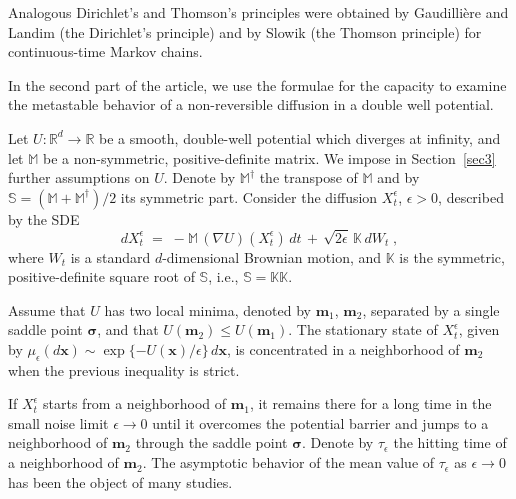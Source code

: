 \documentclass[reqno]{amsart}
\newcounter{as}[section]
\newcommand{\bb}[1]{{\mathbb #1}}
\newcommand{\bs}[1]{{\boldsymbol #1}}
\newcommand{\<}{\langle}
\renewcommand{\>}{\rangle}
\begin{document}
Analogous Dirichlet's and Thomson's principles were obtained by
Gaudilli\`ere and Landim \cite{GL} (the Dirichlet's principle) and by
Slowik \cite{Slo} (the Thomson principle) for continuous-time Markov
chains. \smallskip

In the second part of the article, we use the formulae for the
capacity to examine the metastable behavior of a non-reversible
diffusion in a double well potential.

Let $U\colon \bb R^d\to \bb R$ be a smooth, double-well potential which
diverges at infinity, and let $\bb M$ be a non-symmetric,
positive-definite matrix. We impose in Section~\ref{sec3} further assumptions on $U$. Denote by $\bb{M}^{\dagger}$ the transpose of $\bb
M$ and by $\bb S = (\bb{M}+\bb{M}^{\dagger})/2$ its symmetric part.
Consider the diffusion $X^\epsilon_t$, $\epsilon>0$, described by the
SDE
\begin{equation}
\label{1-3}
dX_{t}^{\epsilon}\;=\;-\bb{M} \, (\nabla U) (X_{t}^{\epsilon})\, dt
\,+\,\sqrt{2\epsilon}\, \bb{K}\, dW_{t}\;,
\end{equation}
where $W_{t}$ is a standard $d$-dimensional Brownian motion, and
$\bb{K}$ is the symmetric, positive-definite square root of $\bb{S}$, i.e.,
$\bb{S}=\bb K \bb K$.

Assume that $U$ has two local minima, denoted by $\bs m_1$, $\bs m_2$,
separated by a single saddle point $\bs \sigma$, and that $U(\bs m_2)
\le U(\bs m_1)$. The stationary state of $X^\epsilon_t$, given by
$\mu_\epsilon(d\bs{x}) \sim \exp\{- U(\bs{x})/\epsilon\}\, d\bs{x}$, is concentrated
in a neighborhood of $\bs m_2$ when the previous inequality is strict.

If $X_{t}^{\epsilon}$ starts from a neighborhood of $\bs m_1$, it
remains there for a long time in the small noise limit $\epsilon\to 0$
until it overcomes the potential barrier and jumps to a neighborhood
of $\bs m_2$ through the saddle point $\bs \sigma$.  Denote by
$\tau_\epsilon$ the hitting time of a neighborhood of $\bs m_2$.  The
asymptotic behavior of the mean value of $\tau_\epsilon$ as
$\epsilon\to 0$ has been the object of many studies.
\end{document}
